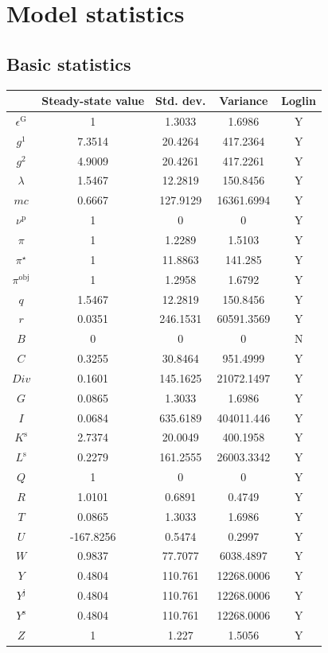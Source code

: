 \section{Model statistics}

\subsection{Basic statistics}

\begin{tabular}{c|c|c|c|c|}
  & Steady-state value & Std. dev. & Variance & Loglin\\
\hline
$\epsilon^{\mathrm{G}}$ & 1 & 1.3033 & 1.6986 & Y    \\
$g^{\mathrm{1}}$ & 7.3514 & 20.4264 & 417.2364 & Y    \\
$g^{\mathrm{2}}$ & 4.9009 & 20.4261 & 417.2261 & Y    \\
$\lambda$ & 1.5467 & 12.2819 & 150.8456 & Y    \\
${m\!c}$ & 0.6667 & 127.9129 & 16361.6994 & Y    \\
$\nu^{\mathrm{p}}$ & 1 & 0 & 0 & Y    \\
$\pi$ & 1 & 1.2289 & 1.5103 & Y    \\
$\pi^{\star}$ & 1 & 11.8863 & 141.285 & Y    \\
$\pi^{\mathrm{obj}}$ & 1 & 1.2958 & 1.6792 & Y    \\
$q$ & 1.5467 & 12.2819 & 150.8456 & Y    \\
$r$ & 0.0351 & 246.1531 & 60591.3569 & Y    \\
$B$ & 0 & 0 & 0 & N    \\
$C$ & 0.3255 & 30.8464 & 951.4999 & Y    \\
${D\!i\!v}$ & 0.1601 & 145.1625 & 21072.1497 & Y    \\
$G$ & 0.0865 & 1.3033 & 1.6986 & Y    \\
$I$ & 0.0684 & 635.6189 & 404011.446 & Y    \\
$K^{\mathrm{s}}$ & 2.7374 & 20.0049 & 400.1958 & Y    \\
$L^{\mathrm{s}}$ & 0.2279 & 161.2555 & 26003.3342 & Y    \\
$Q$ & 1 & 0 & 0 & Y    \\
$R$ & 1.0101 & 0.6891 & 0.4749 & Y    \\
$T$ & 0.0865 & 1.3033 & 1.6986 & Y    \\
$U$ & -167.8256 & 0.5474 & 0.2997 & Y    \\
$W$ & 0.9837 & 77.7077 & 6038.4897 & Y    \\
$Y$ & 0.4804 & 110.761 & 12268.0006 & Y    \\
$Y^{\mathrm{j}}$ & 0.4804 & 110.761 & 12268.0006 & Y    \\
$Y^{\mathrm{s}}$ & 0.4804 & 110.761 & 12268.0006 & Y    \\
$Z$ & 1 & 1.227 & 1.5056 & Y    \\
\hline
\end{tabular}


